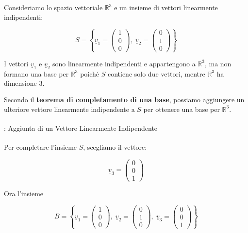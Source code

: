 \begin{es}
	Consideriamo lo spazio vettoriale \( \mathbb{R}^3 \) e un insieme di vettori linearmente indipendenti:
	
	\[
	S = \left\{ \underline{v}_1 = \begin{pmatrix} 1 \\ 0 \\ 0 \end{pmatrix}, \; \underline{v}_2 = \begin{pmatrix} 0 \\ 1 \\ 0 \end{pmatrix} \right\}
	\]
	
	I vettori \( \underline{v}_1 \) e \( \underline{v}_2 \) sono linearmente indipendenti e appartengono a \( \mathbb{R}^3 \), ma non formano una base per \( \mathbb{R}^3 \) poiché \( S \) contiene solo due vettori, mentre \( \mathbb{R}^3 \) ha dimensione 3. 
	
	Secondo il \textbf{teorema di completamento di una base}, possiamo aggiungere un ulteriore vettore linearmente indipendente a \( S \) per ottenere una base per \( \mathbb{R}^3 \).
	\leavevmode\\\\
	: Aggiunta di un Vettore Linearmente Indipendente
	\leavevmode\\\\
	Per completare l'insieme \( S \), scegliamo il vettore:
	
	\[
	\underline{v}_3 = \begin{pmatrix} 0 \\ 0 \\ 1 \end{pmatrix}
	\]
	
	Ora l'insieme
	
	\[
	B = \left\{ \underline{v}_1 = \begin{pmatrix} 1 \\ 0 \\ 0 \end{pmatrix}, \; \underline{v}_2 = \begin{pmatrix} 0 \\ 1 \\ 0 \end{pmatrix}, \; \underline{v}_3 = \begin{pmatrix} 0 \\ 0 \\ 1 \end{pmatrix} \right\}
	\]
	

\end{es}
